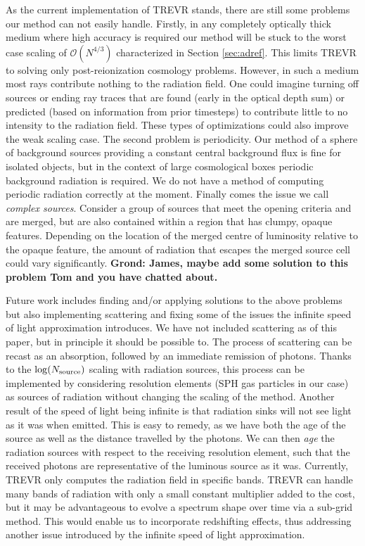 \documentclass[fleq,usenatbib]{mnras}
\newcommand{\acro}{TREVR}
\newcommand{\bigO}[1]{\mathcal{O}\left(#1\right)}
\newcommand{\comment}[1]{\textbf{\color{red}#1}}
\newcommand{\NS}{N_{\rm source}}
\begin{document}
As the current implementation of \acro{} stands, there are still some problems 
our method can not easily handle. Firstly, in any completely optically thick 
medium where high accuracy is required our method will be stuck to the worst 
case scaling of $\bigO{N^{4/3}}$ characterized in Section \ref{sec:adref}. 
This limits \acro{} to solving only post-reionization cosmology problems. 
However, in such a medium most rays contribute nothing to the radiation field. 
One could imagine turning off sources or ending ray traces that are found 
(early in the optical depth sum) or predicted (based on information from prior 
timesteps) to contribute little to no intensity to the radiation field. These 
types of optimizations could also improve the weak scaling case. The second 
problem is periodicity. Our method of a sphere of background sources providing 
a constant central background flux is fine for isolated objects, but in the 
context of large cosmological boxes periodic background radiation is required. 
We do not have a method of computing periodic radiation correctly at the 
moment. Finally comes the issue we call \textit{complex sources}. Consider a 
group of sources that meet the opening criteria and are merged, but are also
contained within a region that has clumpy, opaque features. Depending on the 
location of the merged centre of luminosity relative to the opaque feature, 
the amount of radiation that escapes the merged source cell could vary 
significantly. \comment{Grond: James, maybe add some solution to this problem
Tom and you have chatted about.}

Future work includes finding and/or applying solutions to the above problems 
but also implementing scattering and fixing some of the issues the infinite 
speed of light approximation introduces. We have not included scattering as of 
this paper, but in principle it should be possible to. The process of 
scattering can be recast as an absorption, followed by an immediate remission 
of photons. Thanks to the $\log(\NS)$ scaling with radiation sources, this 
process can be implemented by considering resolution elements (SPH gas 
particles in our case) as sources of radiation without changing the scaling of 
the method. Another result of the speed of light being infinite is that 
radiation sinks will not see light as it was when emitted. This is easy to 
remedy, as we have both the age of the source as well as the distance 
travelled by the photons. We can then \textit{age} the radiation sources with 
respect to the receiving resolution element, such that the received photons 
are representative of the luminous source as it was. Currently, \acro{} only 
computes the radiation field in specific bands. \acro{} can handle many bands 
of radiation with only a small constant multiplier added to the cost, but it 
may be advantageous to evolve a spectrum shape over time via a sub-grid 
method. This would enable us to incorporate redshifting effects, thus 
addressing another issue introduced by the infinite speed of light 
approximation.
\end{document}
